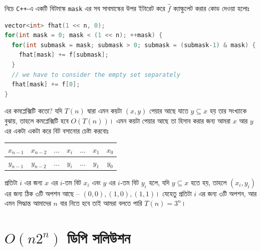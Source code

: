 নিচে \texttt{C++}-এ
একটি বিটমাস্ক \texttt{mask} এর সব সাবমাস্কের উপর ইটারেট করে $\hat{f}$
ক্যাল্কুলেট করার কোড দেওয়া হলোঃ
\begin{lstlisting}[language=C++]
vector<int> fhat(1 << n, 0);
for(int mask = 0; mask < (1 << n); ++mask) {
  for(int submask = mask; submask > 0; submask = (submask-1) & mask) {
    fhat[mask] += f[submask];
  }
  // we have to consider the empty set separately
  fhat[mask] += f[0];
}
\end{lstlisting}
এর কমপ্লেক্সিটি কতো? যদি $T(n)$ দ্বারা এমন কয়টা $(x, y)$ পেয়ার আছে যাতে $y
\subseteq x$ হয় তার সংখ্যাকে বুঝায়, তাহলে কমপ্লেক্সিটি হবে $O(T(n))$। এমন
কয়টা পেয়ার আছে তা হিসাব করার জন্য আমরা $x$ আর $y$ এর একটা একটা করে বিট বসানোর
চেষ্টা করবোঃ
\begin{center}
  \begin{tabular}{|c|c|c|c|c|c|c|}
    \hline
    $x_{n-1}$ & $x_{n-2}$ & $\dots$ & $x_i$ & $\dots$ & $x_{1}$ & $x_{0}$\\
    \hline
    $y_{n-1}$ & $y_{n-2}$ & $\dots$ & $y_i$ & $\dots$ & $y_{1}$ & $y_{0}$\\
    \hline
  \end{tabular}
\end{center}
প্রতিটা $i$ এর জন্য $x$ এর $i$-তম বিট $x_i$ এবং $y$ এর $i$-তম বিট $y_i$ হলে,
যদি $y \subseteq x$ হতে হয়, তাহলে $(x_i, y_i)$ এর জন্য ঠিক ৩টি অপশন আছে --
$(0, 0), (1, 0), (1, 1)$। যেহেতু প্রতিটা $i$ এর জন্য ৩টি অপশন, আর এমন
সিদ্ধান্ত আমাদের $n$ বার নিতে হবে তাই আমরা বলতে পারি $T(n) = 3^n$।

\section{\texorpdfstring{$O(n2^n)$}{O(n pow(2, n))} ডিপি সলিউশন}

